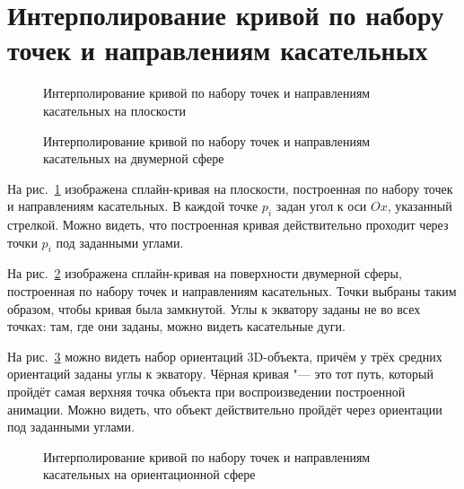 \section{Интерполирование кривой по набору точек и направлениям касательных}

\begin{figure}[h!]
\caption{Интерполирование кривой по набору точек и направлениям касательных на плоскости}
\label{picture-by-tangents-plane}
\end{figure}

\begin{figure}[h!]
\caption{Интерполирование кривой по набору точек и направлениям касательных на двумерной сфере}
\label{picture-by-tangents-two-dimension}
\end{figure}

На рис.~\ref{picture-by-tangents-plane} изображена сплайн-кривая на плоскости, построенная по набору точек и
направлениям касательных. В каждой точке $p_i$ задан угол к оси $Ox$, указанный стрелкой. Можно видеть, что
построенная кривая действительно проходит через точки $p_i$ под заданными углами.

На рис.~\ref{picture-by-tangents-two-dimension} изображена сплайн-кривая на поверхности двумерной сферы, построенная
по набору точек и направлениям касательных. Точки выбраны таким образом, чтобы кривая была замкнутой. Углы к экватору
заданы не во всех точках: там, где они заданы, можно видеть касательные дуги.

На рис.~\ref{picture-by-tangents-orientation} можно видеть набор ориентаций 3D-объекта, причём у трёх средних
ориентаций заданы углы к экватору. Чёрная кривая "--- это тот путь, который пройдёт самая верхняя точка объекта
при воспроизведении построенной анимации. Можно видеть, что объект действительно пройдёт через ориентации под
заданными углами.

\begin{figure}[h!]
\caption{Интерполирование кривой по набору точек и направлениям касательных на ориентационной сфере}
\label{picture-by-tangents-orientation}
\end{figure}
